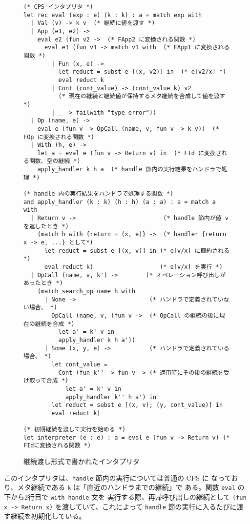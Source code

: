\begin{figure}
\begin{verbatim}
(* CPS インタプリタ *)
let rec eval (exp : e) (k : k) : a = match exp with
  | Val (v) -> k v  (* 継続に値を渡す *)
  | App (e1, e2) ->
    eval e2 (fun v2 ->  (* FApp2 に変換される関数 *)
      eval e1 (fun v1 -> match v1 with  (* FApp1 に変換される関数 *)
        | Fun (x, e) ->
          let reduct = subst e [(x, v2)] in  (* e[v2/x] *)
          eval reduct k
        | Cont (cont_value) -> (cont_value k) v2
          (* 現在の継続と継続値が保持するメタ継続を合成して値を渡す *)
        | _ -> failwith "type error"))
  | Op (name, e) ->
    eval e (fun v -> OpCall (name, v, fun v -> k v))  (* FOp に変換される関数 *)
  | With (h, e) ->
    let a = eval e (fun v -> Return v) in  (* FId に変換される関数、空の継続 *)
    apply_handler k h a  (* handle 節内の実行結果をハンドラで処理 *)

(* handle 内の実行結果をハンドラで処理する関数 *)
and apply_handler (k : k) (h : h) (a : a) : a = match a with
  | Return v ->                         (* handle 節内が値 v を返したとき *)
    (match h with {return = (x, e)} ->  (* handler {return x -> e, ...} として*)
      let reduct = subst e [(x, v)] in (* e[v/x] に簡約される *)
      eval reduct k)                   (* e[v/x] を実行 *)
  | OpCall (name, v, k') ->        (* オペレーション呼び出しがあったとき *)
    (match search_op name h with
      | None ->                     (* ハンドラで定義されていない場合、 *)
        OpCall (name, v, (fun v ->  (* OpCall の継続の後に現在の継続を合成 *)
          let a' = k' v in
          apply_handler k h a'))
      | Some (x, y, e) ->           (* ハンドラで定義されている場合、 *)
        let cont_value =
          Cont (fun k'' -> fun v -> (* 適用時にその後の継続を受け取って合成 *)
            let a' = k' v in
            apply_handler k'' h a') in
        let reduct = subst e [(x, v); (y, cont_value)] in
        eval reduct k)

(* 初期継続を渡して実行を始める *)
let interpreter (e : e) : a = eval e (fun v -> Return v) (* FIdに変換される関数 *)
\end{verbatim}
\caption{継続渡し形式で書かれたインタプリタ}
\label{figure:1cps}
\end{figure}

このインタプリタは、\texttt{handle} 節内の実行については普通の CPS に
なっており、メタ継続である \texttt{k} は「直近のハンドラまでの継続」で
ある。関数 \texttt{eval} の下から2行目で \texttt{with handle} 文を
実行する際、再帰呼び出しの継続として
\texttt{(fun x -> Return x)} を渡していて、これによって
\texttt{handle} 節の実行に入るたびに渡す継続を初期化している。


